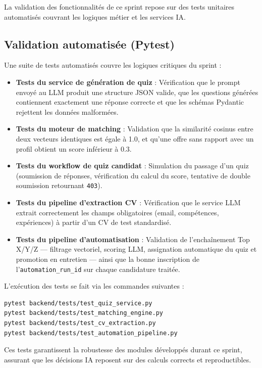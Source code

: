 La validation des fonctionnalités de ce sprint repose sur des tests unitaires automatisés couvrant les logiques métier et les services IA.

\subsection{Validation automatisée (Pytest)}

Une suite de tests automatisés couvre les logiques critiques du sprint :

\begin{itemize}
    \item \textbf{Tests du service de génération de quiz} : Vérification que le prompt envoyé au LLM produit une structure JSON valide, que les questions générées contiennent exactement une réponse correcte et que les schémas Pydantic rejettent les données malformées.
    \item \textbf{Tests du moteur de matching} : Validation que la similarité cosinus entre deux vecteurs identiques est égale à 1.0, et qu'une offre sans rapport avec un profil obtient un score inférieur à 0.3.
    \item \textbf{Tests du workflow de quiz candidat} : Simulation du passage d'un quiz (soumission de réponses, vérification du calcul du score, tentative de double soumission retournant \texttt{403}).
    \item \textbf{Tests du pipeline d'extraction CV} : Vérification que le service LLM extrait correctement les champs obligatoires (email, compétences, expériences) à partir d'un CV de test standardisé.
    \item \textbf{Tests du pipeline d'automatisation} : Validation de l'enchaînement Top X/Y/Z — filtrage vectoriel, scoring LLM, assignation automatique du quiz et promotion en entretien — ainsi que la bonne inscription de l'\texttt{automation\_run\_id} sur chaque candidature traitée.
\end{itemize}

L'exécution des tests se fait via les commandes suivantes :

\begin{verbatim}
pytest backend/tests/test_quiz_service.py
pytest backend/tests/test_matching_engine.py
pytest backend/tests/test_cv_extraction.py
pytest backend/tests/test_automation_pipeline.py
\end{verbatim}

Ces tests garantissent la robustesse des modules développés durant ce sprint, assurant que les décisions IA reposent sur des calculs corrects et reproductibles.

